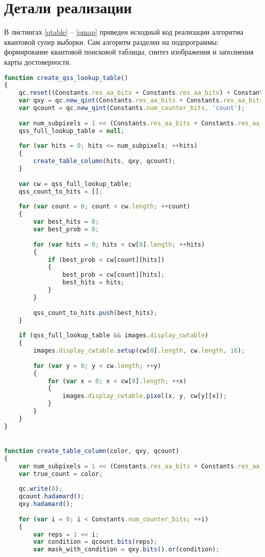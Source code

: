 \section{Детали реализации}

В листингах \ref{qtable} -- \ref{qmap} приведен исходный код реализации алгоритма квантовой супер выборки. Сам алгоритм разделен на подпрограммы: формирование квантовой поисковой таблицы, синтез изображения и заполнения карты достоверности. 

\begin{lstlisting}[label=qtable,caption=Функция формирования квантовой поисковой таблицы, language=javascript]
function create_qss_lookup_table()
{
	qc.reset((Constants.res_aa_bits + Constants.res_aa_bits) + Constants.num_counter_bits);
	var qxy = qc.new_qint(Constants.res_aa_bits + Constants.res_aa_bits, 'qxy');
	var qcount = qc.new_qint(Constants.num_counter_bits, 'count');
	
	var num_subpixels = 1 << (Constants.res_aa_bits + Constants.res_aa_bits)
	qss_full_lookup_table = null;
	
	for (var hits = 0; hits <= num_subpixels; ++hits)
	{
		create_table_column(hits, qxy, qcount);
	}
	
	var cw = qss_full_lookup_table;
	qss_count_to_hits = [];
	
	for (var count = 0; count < cw.length; ++count)
	{
		var best_hits = 0;
		var best_prob = 0;
	
		for (var hits = 0; hits < cw[0].length; ++hits)
		{
			if (best_prob < cw[count][hits])
			{
				best_prob = cw[count][hits];
				best_hits = hits;
			}
		}
	
		qss_count_to_hits.push(best_hits);
	}
	
	if (qss_full_lookup_table && images.display_cwtable)
	{
		images.display_cwtable.setup(cw[0].length, cw.length, 16);
		
		for (var y = 0; y < cw.length; ++y)
		{
			for (var x = 0; x < cw[0].length; ++x)
			{
				images.display_cwtable.pixel(x, y, cw[y][x]);
			}
		}
	}
}


function create_table_column(color, qxy, qcount)
{
	var num_subpixels = 1 << (Constants.res_aa_bits + Constants.res_aa_bits)
	var true_count = color;
	
	qc.write(0);
	qcount.hadamard();
	qxy.hadamard();
	
	for (var i = 0; i < Constants.num_counter_bits; ++i)
	{
		var reps = 1 << i;
		var condition = qcount.bits(reps);
		var mask_with_condition = qxy.bits().or(condition);
	

\end{lstlisting}
